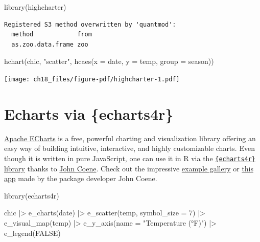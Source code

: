 \documentclass[
  letterpaper,
  DIV=11,
  numbers=noendperiod]{scrreprt}
\newenvironment{Shaded}{\begin{snugshade}}{\end{snugshade}}
\newcommand{\AttributeTok}[1]{\textcolor[rgb]{0.40,0.45,0.13}{#1}}
\newcommand{\ConstantTok}[1]{\textcolor[rgb]{0.56,0.35,0.01}{#1}}
\newcommand{\DecValTok}[1]{\textcolor[rgb]{0.68,0.00,0.00}{#1}}
\newcommand{\FunctionTok}[1]{\textcolor[rgb]{0.28,0.35,0.67}{#1}}
\newcommand{\NormalTok}[1]{\textcolor[rgb]{0.00,0.23,0.31}{#1}}
\newcommand{\SpecialCharTok}[1]{\textcolor[rgb]{0.37,0.37,0.37}{#1}}
\newcommand{\StringTok}[1]{\textcolor[rgb]{0.13,0.47,0.30}{#1}}
\begin{document}
\begin{Shaded}
\begin{Highlighting}[]
\FunctionTok{library}\NormalTok{(highcharter)}
\end{Highlighting}
\end{Shaded}

\begin{verbatim}
Registered S3 method overwritten by 'quantmod':
  method            from
  as.zoo.data.frame zoo 
\end{verbatim}

\begin{Shaded}
\begin{Highlighting}[]
\FunctionTok{hchart}\NormalTok{(chic, }\StringTok{"scatter"}\NormalTok{, }\FunctionTok{hcaes}\NormalTok{(}\AttributeTok{x =}\NormalTok{ date, }\AttributeTok{y =}\NormalTok{ temp, }\AttributeTok{group =}\NormalTok{ season))}
\end{Highlighting}
\end{Shaded}

\texttt{[image: ch18\_files/figure-pdf/highcharter-1.pdf]}

\section{Echarts via \{echarts4r\}}\label{echarts-via-echarts4r}

\href{https://echarts.apache.org/en/index.html}{Apache ECharts} is a
free, powerful charting and visualization library offering an easy way
of building intuitive, interactive, and highly customizable charts. Even
though it is written in pure JavaScript, one can use it in R via the
\href{https://echarts4r.john-coene.com/}{\texttt{\{echarts4r\}} library}
thanks to \href{https://john-coene.com/}{John Coene}. Check out the
impressive
\href{https://echarts4r.john-coene.com/articles/chart_types.html}{example
gallery} or \href{https://johncoene.shinyapps.io/fopi-contest/}{this
app} made by the package developer John Coene.

\begin{Shaded}
\begin{Highlighting}[]
\FunctionTok{library}\NormalTok{(echarts4r)}

\NormalTok{chic }\SpecialCharTok{|\textgreater{}}
  \FunctionTok{e\_charts}\NormalTok{(date) }\SpecialCharTok{|\textgreater{}}
  \FunctionTok{e\_scatter}\NormalTok{(temp, }\AttributeTok{symbol\_size =} \DecValTok{7}\NormalTok{) }\SpecialCharTok{|\textgreater{}}
  \FunctionTok{e\_visual\_map}\NormalTok{(temp) }\SpecialCharTok{|\textgreater{}}
  \FunctionTok{e\_y\_axis}\NormalTok{(}\AttributeTok{name =} \StringTok{"Temperature (°F)"}\NormalTok{) }\SpecialCharTok{|\textgreater{}}
  \FunctionTok{e\_legend}\NormalTok{(}\ConstantTok{FALSE}\NormalTok{)}
\end{Highlighting}
\end{Shaded}
\end{document}
